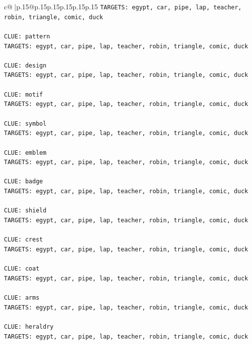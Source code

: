 \documentclass{article}
\begin{document}
{\begin{supertabular}{c@{$\;$}|p{.15\linewidth}@{}p{.15\linewidth}p{.15\linewidth}p{.15\linewidth}p{.15\linewidth}p{.15\linewidth}}
{{{\texttt{TARGETS: egypt, car, pipe, lap, teacher, robin, triangle, comic, duck} \\
\\ 
\texttt{CLUE: pattern} \\
\texttt{TARGETS: egypt, car, pipe, lap, teacher, robin, triangle, comic, duck} \\
\\ 
\texttt{CLUE: design} \\
\texttt{TARGETS: egypt, car, pipe, lap, teacher, robin, triangle, comic, duck} \\
\\ 
\texttt{CLUE: motif} \\
\texttt{TARGETS: egypt, car, pipe, lap, teacher, robin, triangle, comic, duck} \\
\\ 
\texttt{CLUE: symbol} \\
\texttt{TARGETS: egypt, car, pipe, lap, teacher, robin, triangle, comic, duck} \\
\\ 
\texttt{CLUE: emblem} \\
\texttt{TARGETS: egypt, car, pipe, lap, teacher, robin, triangle, comic, duck} \\
\\ 
\texttt{CLUE: badge} \\
\texttt{TARGETS: egypt, car, pipe, lap, teacher, robin, triangle, comic, duck} \\
\\ 
\texttt{CLUE: shield} \\
\texttt{TARGETS: egypt, car, pipe, lap, teacher, robin, triangle, comic, duck} \\
\\ 
\texttt{CLUE: crest} \\
\texttt{TARGETS: egypt, car, pipe, lap, teacher, robin, triangle, comic, duck} \\
\\ 
\texttt{CLUE: coat} \\
\texttt{TARGETS: egypt, car, pipe, lap, teacher, robin, triangle, comic, duck} \\
\\ 
\texttt{CLUE: arms} \\
\texttt{TARGETS: egypt, car, pipe, lap, teacher, robin, triangle, comic, duck} \\
\\ 
\texttt{CLUE: heraldry} \\
\texttt{TARGETS: egypt, car, pipe, lap, teacher, robin, triangle, comic, duck} \\
}}}
\end{supertabular}}
\end{document}
